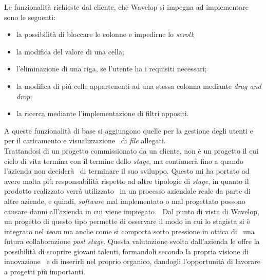 Le funzionalità richieste dal cliente, che Wavelop si impegna ad implementare sono le seguenti: \
\begin{itemize}
  \item la possibilità di bloccare le colonne e impedirne lo \emph{scroll};
  \item la modifica del valore di una cella;
  \item l'eliminazione di una riga, se l'utente ha i requisiti necessari;
  \item la modifica di più celle appartenenti ad una stessa colonna mediante \emph{drag and drop};
  \item la ricerca mediante l'implementazione di filtri appositi.
\end{itemize}
A queste funzionalità di base si aggiungono quelle per la gestione degli utenti e per il caricamento e visualizzazione \
di \emph{file} allegati. \\

Trattandosi di un progetto commissionato da un cliente, non è un progetto il cui ciclo di vita termina con il termine dello \emph{stage}, ma continuerà fino a quando l'azienda non deciderà \
di terminare il suo sviluppo. Questo mi ha portato ad avere molta più responsabilità rispetto ad altre tipologie di \emph{stage}, in quanto il prodotto realizzato verrà utilizzato \
in un processo aziendale reale da parte di altre aziende, e quindi, \emph{software} mal implementato o mal progettato possono causare danni all'azienda in cui viene impiegato. \
Dal punto di vista di Wavelop, un progetto di questo tipo permette di osservare il modo in cui lo stagista si è integrato nel \emph{team} ma anche come si comporta sotto pressione in ottica di \
una futura collaborazione \emph{post stage}. Questa valutazione svolta dall'azienda le offre la possibilità di scoprire giovani talenti, formandoli secondo la propria visione di innovazione \
e di inserirli nel proprio organico, dandogli l'opportunità di lavorare a progetti più importanti.

